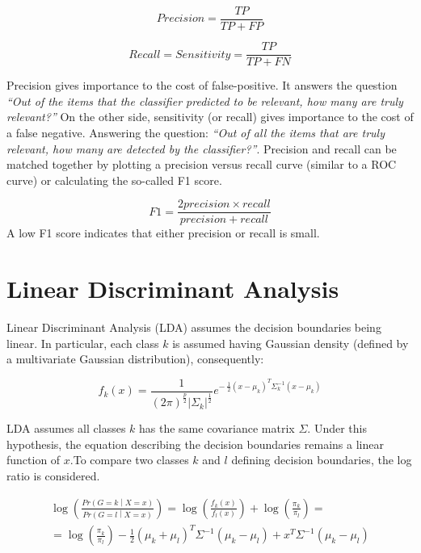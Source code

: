 \begin{equation}
    Precision=\frac{TP}{TP+FP}
    \label{eq_precision}
\end{equation}

\begin{equation}
    Recall=Sensitivity=\frac{TP}{TP+FN}
    \label{eq_recall}
\end{equation}

Precision gives importance to the cost of false-positive. It answers the question \textit{“Out of the items that the classifier predicted to be relevant, how many are truly relevant?”} On the other side, sensitivity (or recall) gives importance to the cost of a false negative. Answering the question: \textit{“Out of all the items that are truly relevant, how many are detected by the classifier?”}. Precision and recall can be matched together by plotting a precision versus recall curve (similar to a ROC curve) or calculating the so-called F1 score.

\begin{equation}
    F1=\frac{2precision\times recall}{precision+recall}
    \label{eq_f1Score}
\end{equation}
A low F1 score indicates that either precision or recall is small.

\section{Linear Discriminant Analysis}
Linear Discriminant Analysis (LDA) assumes the decision boundaries being linear. In particular, each class $k$ is assumed having Gaussian density (defined by a multivariate Gaussian distribution), consequently:

\begin{equation}
    f_k\left(x\right)=\frac{1}{\left(2\pi\right)^\frac{p}{2}\left|\Sigma_k\right|^\frac{1}{2}}e^{-\ \frac{1}{2}\left(x-\mu_k\right)^T\Sigma_k^{-1}(x-\mu_k)}
    \label{eq_LDA1}
\end{equation}

LDA assumes all classes $k$ has the same covariance matrix $\Sigma$. Under this hypothesis, the equation describing the decision boundaries remains a linear function of $x$.To compare two classes $k$ and $l$ defining decision boundaries, the log ratio is considered.

\begin{equation}
    \begin{split}
        \log{\left(\frac{Pr{\left(G=k\middle| X=x\right)}}{Pr{\left(G=l\middle| X=x\right)}}\right)}= \log{\left(\frac{f_k\left(x\right)}{f_l\left(x\right)}\right)}+\log{\left(\frac{\pi_k}{\pi_l}\right)}= \\    
        = \log{\left(\frac{\pi_k}{\pi_l}\right)}-\frac{1}{2}\left(\mu_k+\mu_l\right)^T\Sigma^{-1}\left(\mu_k-\mu_l\right)+x^T\Sigma^{-1}(\mu_k-\mu_l)\\
    \end{split}
    \label{eq_LDA2}
\end{equation}

